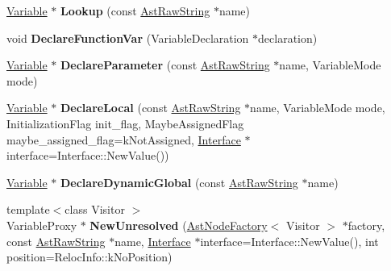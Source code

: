 \begin{DoxyCompactItemize}
\item 
\hypertarget{classv8_1_1internal_1_1_scope_a29d38e98f2e9fae2b6b42908d125cc6e}{}\hyperlink{classv8_1_1internal_1_1_variable}{Variable} $\ast$ {\bfseries Lookup} (const \hyperlink{classv8_1_1internal_1_1_ast_raw_string}{Ast\+Raw\+String} $\ast$name)\label{classv8_1_1internal_1_1_scope_a29d38e98f2e9fae2b6b42908d125cc6e}

\item 
\hypertarget{classv8_1_1internal_1_1_scope_a2af668e427258bf92475073646356aa8}{}void {\bfseries Declare\+Function\+Var} (Variable\+Declaration $\ast$declaration)\label{classv8_1_1internal_1_1_scope_a2af668e427258bf92475073646356aa8}

\item 
\hypertarget{classv8_1_1internal_1_1_scope_ad0aeaab4f1d777a2997d636cddf2992c}{}\hyperlink{classv8_1_1internal_1_1_variable}{Variable} $\ast$ {\bfseries Declare\+Parameter} (const \hyperlink{classv8_1_1internal_1_1_ast_raw_string}{Ast\+Raw\+String} $\ast$name, Variable\+Mode mode)\label{classv8_1_1internal_1_1_scope_ad0aeaab4f1d777a2997d636cddf2992c}

\item 
\hypertarget{classv8_1_1internal_1_1_scope_a4c3976b1d047b0de566e10a231de6c64}{}\hyperlink{classv8_1_1internal_1_1_variable}{Variable} $\ast$ {\bfseries Declare\+Local} (const \hyperlink{classv8_1_1internal_1_1_ast_raw_string}{Ast\+Raw\+String} $\ast$name, Variable\+Mode mode, Initialization\+Flag init\+\_\+flag, Maybe\+Assigned\+Flag maybe\+\_\+assigned\+\_\+flag=k\+Not\+Assigned, \hyperlink{classv8_1_1internal_1_1_interface}{Interface} $\ast$interface=Interface\+::\+New\+Value())\label{classv8_1_1internal_1_1_scope_a4c3976b1d047b0de566e10a231de6c64}

\item 
\hypertarget{classv8_1_1internal_1_1_scope_a4aee616d790a86a88ca1c2c9a350e71f}{}\hyperlink{classv8_1_1internal_1_1_variable}{Variable} $\ast$ {\bfseries Declare\+Dynamic\+Global} (const \hyperlink{classv8_1_1internal_1_1_ast_raw_string}{Ast\+Raw\+String} $\ast$name)\label{classv8_1_1internal_1_1_scope_a4aee616d790a86a88ca1c2c9a350e71f}

\item 
\hypertarget{classv8_1_1internal_1_1_scope_a6aebd62394d4589ac0cf0c43dbaae29c}{}{\footnotesize template$<$class Visitor $>$ }\\Variable\+Proxy $\ast$ {\bfseries New\+Unresolved} (\hyperlink{classv8_1_1internal_1_1_ast_node_factory}{Ast\+Node\+Factory}$<$ Visitor $>$ $\ast$factory, const \hyperlink{classv8_1_1internal_1_1_ast_raw_string}{Ast\+Raw\+String} $\ast$name, \hyperlink{classv8_1_1internal_1_1_interface}{Interface} $\ast$interface=Interface\+::\+New\+Value(), int position=Reloc\+Info\+::k\+No\+Position)\label{classv8_1_1internal_1_1_scope_a6aebd62394d4589ac0cf0c43dbaae29c}


\end{DoxyCompactItemize}
